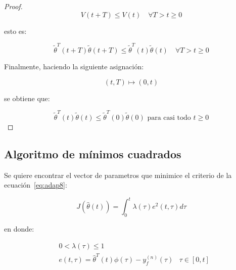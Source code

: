\begin{proof}
                \begin{equation*}
                    V(t + T) \le V(t) \quad \forall T > t \ge 0
                \end{equation*}

                esto es:

                \begin{equation*}
                    \tilde{\theta}^T(t + T) \tilde{\theta}(t + T) \le \tilde{\theta}^T(t) \tilde{\theta}(t) \quad \forall T > t \ge 0
                \end{equation*}

                Finalmente, haciendo la siguiente asignación:

                \begin{equation*}
                    (t, T) \mapsto (0, t)
                \end{equation*}

                se obtiene que:

                \begin{equation*}
                    \tilde{\theta}^T(t) \tilde{\theta}(t) \le \tilde{\theta}^T(0) \tilde{\theta}(0) \text{ para casi todo } t \ge 0
                \end{equation*}
            \end{proof}


        \subsection{Algoritmo de mínimos cuadrados}

            \begin{problema}
                Se quiere encontrar el vector de parametros que minimice el criterio de la ecuación~\ref{eq:adap8}:

                \begin{equation} \label{eq:adap8}
                    J \left( \hat{\theta}(t) \right) = \int_0^t \lambda(\tau) e^2 (t, \tau) d\tau
                \end{equation}

                en donde:

                \begin{eqnarray}
                    & 0 < \lambda(\tau) \le 1 & \nonumber \\
                    & e(t, \tau) = \hat{\theta}^T(t) \phi(\tau) - y_f^{(n)}(\tau) & \tau \in [0, t]
                \end{eqnarray}
            \end{problema}


